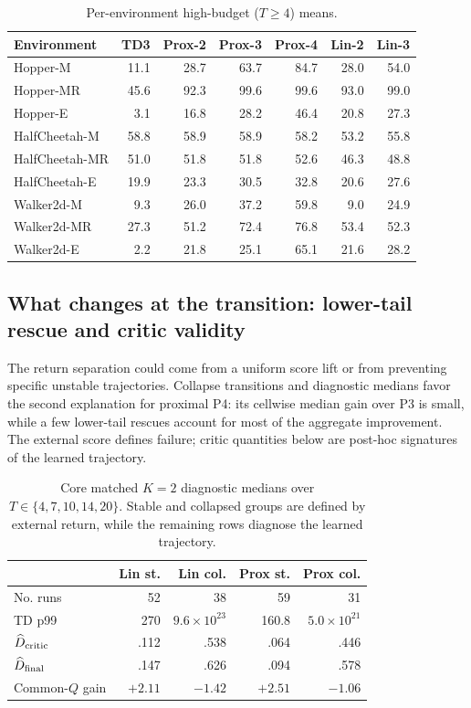 \documentclass[twoside]{article}
\begin{document}
\begin{table}[t]
\caption{Per-environment high-budget ($T\ge4$) means.}
\centering
\small
\setlength{\tabcolsep}{3.5pt}
\begin{tabular}{lrrrrrr}
\toprule
Environment&TD3&Prox-2&Prox-3&Prox-4&Lin-2&Lin-3\\
\midrule
Hopper-M&11.1&28.7&63.7&84.7&28.0&54.0\\
Hopper-MR&45.6&92.3&99.6&99.6&93.0&99.0\\
Hopper-E&3.1&16.8&28.2&46.4&20.8&27.3\\
HalfCheetah-M&58.8&58.9&58.9&58.2&53.2&55.8\\
HalfCheetah-MR&51.0&51.8&51.8&52.6&46.3&48.8\\
HalfCheetah-E&19.9&23.3&30.5&32.8&20.6&27.6\\
Walker2d-M&9.3&26.0&37.2&59.8&9.0&24.9\\
Walker2d-MR&27.3&51.2&72.4&76.8&53.4&52.3\\
Walker2d-E&2.2&21.8&25.1&65.1&21.6&28.2\\
\bottomrule
\end{tabular}
\label{tab:env_high}
\end{table}

\subsection{What changes at the transition: lower-tail rescue and critic validity}

The return separation could come from a uniform score lift or from preventing
specific unstable trajectories. Collapse transitions and diagnostic medians
favor the second explanation for proximal P4: its cellwise median gain over P3
is small, while a few lower-tail rescues account for most of the aggregate
improvement. The external score defines failure; critic quantities below are
post-hoc signatures of the learned trajectory.

\begin{table}[t]
\caption{Core matched $K=2$ diagnostic medians over
$T\in\{4,7,10,14,20\}$. Stable and collapsed groups are defined by external
return, while the remaining rows diagnose the learned trajectory.}
\centering
\small
\setlength{\tabcolsep}{2pt}
\begin{tabular}{lrrrr}
\toprule
&Lin st.&Lin col.&Prox st.&Prox col.\\
\midrule
No. runs&52&38&59&31\\
TD p99&270&$9.6\!\times\!10^{23}$&160.8&$5.0\!\times\!10^{21}$\\
$\widehat D_{\rm critic}$&.112&.538&.064&.446\\
$\widehat D_{\rm final}$&.147&.626&.094&.578\\
Common-$Q$ gain&$+2.11$&$-1.42$&$+2.51$&$-1.06$\\
\bottomrule
\end{tabular}
\label{tab:diagnostic_medians}
\end{table}
\end{document}
